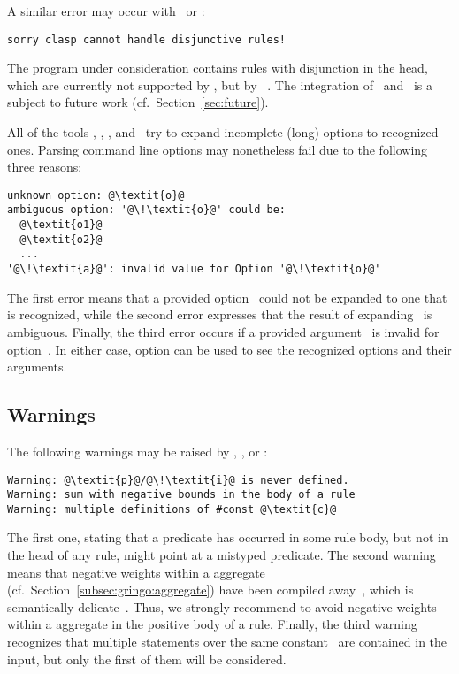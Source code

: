 A similar error may occur with \clingo\ or \iclingo:
%
\begin{lstlisting}[numbers=none,escapechar=@]
sorry clasp cannot handle disjunctive rules!
\end{lstlisting}
%
The program under consideration contains rules with disjunction in the head,
which are currently not supported by \clasp,
but by \claspD~\cite{drgegrkakoossc08a}.
The integration of \clasp\ and \claspD\ is a subject to future work
(cf.\ Section~\ref{sec:future}).

All of the tools \gringo, \clasp, \clingo, and \iclingo\
try to expand incomplete (long) options to recognized ones.
Parsing command line options may nonetheless fail due to the following three reasons:
%
\begin{lstlisting}[numbers=none,escapechar=@]
unknown option: @\textit{o}@
ambiguous option: '@\!\textit{o}@' could be:
  @\textit{o1}@
  @\textit{o2}@
  ...
'@\!\textit{a}@': invalid value for Option '@\!\textit{o}@'
\end{lstlisting}
%
The first error means that a provided option~
could not be expanded to one that is recognized,
while the second error expresses that the result of expanding~
is ambiguous.
Finally, the third error occurs if a provided argument~
is invalid for option~\code{\textit{o}}.
In either case, option  can be used to see 
the recognized options and their arguments.


\subsection{Warnings}\label{subsec:warn}

The following warnings may be raised by \gringo, \clingo, or \iclingo:
%
\begin{lstlisting}[numbers=none,escapechar=@]
Warning: @\textit{p}@/@\!\textit{i}@ is never defined.
Warning: sum with negative bounds in the body of a rule
Warning: multiple definitions of #const @\textit{c}@
\end{lstlisting}
%
The first one, stating that a predicate 
has occurred in some rule body, but not in the head of any rule,
might point at a mistyped predicate.
The second warning means that negative weights within a  aggregate
(cf.\ Section~\ref{subsec:gringo:aggregate})
have been compiled away~\cite{siniso02a},
which is semantically delicate~\cite{ferraris05a}.
Thus, we strongly recommend to avoid negative weights
within a  aggregate in the positive body of a rule.
Finally, the third warning recognizes that multiple 
statements over the same constant~\code{\textit{c}} are contained in the input,
but only the first of them will be considered.

